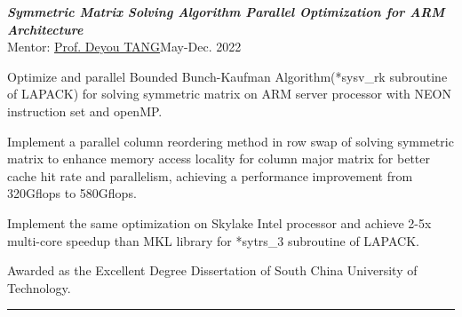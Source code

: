 \documentclass[10pt]{article}
\newenvironment{outerlist}[1][\enskip\textbullet]%
        {%
        \begin{itemize}[label=#1, itemsep=1pt]}{\end{itemize}%
         \vspace{-0.6\baselineskip}}
\newenvironment{innerlist}[1][\enskip$\circ$]%
        {\begin{compactitem}[#1]}{\end{compactitem}}
\begin{document}
\begin{outerlist}
\item {\it\textbf{Symmetric Matrix Solving Algorithm Parallel Optimization for ARM Architecture}}\\
	Mentor: \href{http://www2.scut.edu.cn/sse/2018/0614/c16789a270678/page.htm}{Prof. Deyou TANG}\hfill May-Dec. 2022\\
	\vspace{-0.2in}
	\begin{innerlist}
		\item Optimize and parallel Bounded Bunch-Kaufman Algorithm(*sysv\_rk subroutine of LAPACK) for solving symmetric matrix on ARM server processor with NEON instruction set and openMP.
		\item Implement a parallel column reordering method in row swap of solving symmetric matrix to enhance memory access locality for column major matrix for better cache hit rate and parallelism, achieving a performance improvement from 320Gflops to 580Gflops.
		\item Implement the same optimization on Skylake Intel processor and achieve 2-5x multi-core speedup than MKL library for *sytrs\_3 subroutine of LAPACK.
		\item Awarded as the Excellent Degree Dissertation of South China University of Technology.
	\end{innerlist}




\end{outerlist}

 \noindent\rule{\textwidth}{1pt}
\end{document}
